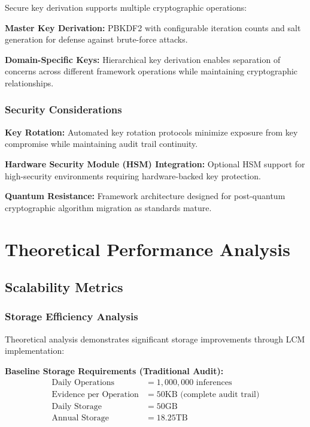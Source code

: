 \documentclass[12pt,a4paper]{article}
\begin{document}
Secure key derivation supports multiple cryptographic operations:

\textbf{Master Key Derivation:} PBKDF2 with configurable iteration counts and salt generation for defense against brute-force attacks.

\textbf{Domain-Specific Keys:} Hierarchical key derivation enables separation of concerns across different framework operations while maintaining cryptographic relationships.

\subsubsection{Security Considerations}

\textbf{Key Rotation:} Automated key rotation protocols minimize exposure from key compromise while maintaining audit trail continuity.

\textbf{Hardware Security Module (HSM) Integration:} Optional HSM support for high-security environments requiring hardware-backed key protection.

\textbf{Quantum Resistance:} Framework architecture designed for post-quantum cryptographic algorithm migration as standards mature.

\section{Theoretical Performance Analysis}

\subsection{Scalability Metrics}

\subsubsection{Storage Efficiency Analysis}

Theoretical analysis demonstrates significant storage improvements through LCM implementation:

\textbf{Baseline Storage Requirements (Traditional Audit):}
\begin{align}
\text{Daily Operations} &= 1,000,000 \text{ inferences} \\
\text{Evidence per Operation} &= 50\text{KB (complete audit trail)} \\
\text{Daily Storage} &= 50\text{GB} \\
\text{Annual Storage} &= 18.25\text{TB}
\end{align}
\end{document}
